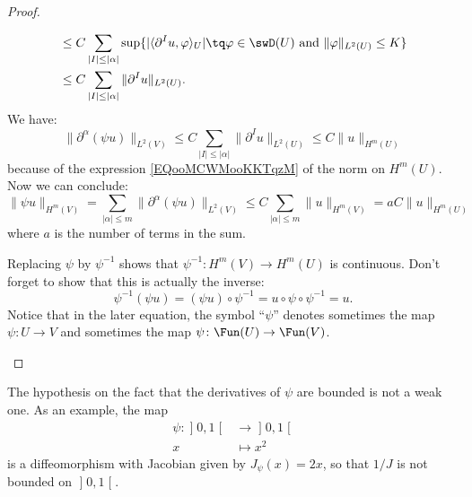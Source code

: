 \begin{proof}
\begin{subproof}
\begin{subequations}
\begin{align}
				                                         & \leq C\sum_{| I |\leq | \alpha |} \sup\{ |\langle \partial^Iu, \varphi\rangle_U|\tq \varphi\in\swD(U)\text{ and }\| \varphi \|_{L^2(U)}\leq K  \} \\
				                                         & \leq C\sum_{| I |\leq | \alpha |}\| \partial^Iu \|_{L^2(U)}.
			\end{align}
		\end{subequations}
		We have:
		\begin{equation}
			\| \partial^{\alpha}(\psi u) \|_{L^2(V)}\leq C\sum_{| I |\leq | \alpha |}\| \partial^Iu \|_{L^2(U)}\leq C\| u \|_{H^m(U)}
		\end{equation}
		because of the expression \eqref{EQooMCWMooKKTqzM} of the norm on \( H^m(U)\). Now we can conclude:
		\begin{equation}
			\| \psi u \|_{H^m(V)}=\sum_{| \alpha |\leq m}\| \partial^{\alpha}(\psi u) \|_{L^2(V)}\leq C\sum_{| \alpha |\leq m}\| u \|_{H^m(V)} = a C\| u  \|_{H^m(U)}
		\end{equation}
		where \( a\) is the number of terms in the sum.


		Replacing \( \psi\) by \( \psi^{-1}\) shows that \( \psi^{-1}\colon H^m(V)\to H^m(U)\) is continuous. Don't forget to show that this is actually the inverse:
		\begin{equation}
			\psi^{-1}(\psi u)=(\psi u)\circ \psi^{-1}=u\circ\psi\circ\psi^{-1}=u.
		\end{equation}
		Notice that in the later equation, the symbol ``$\psi$'' denotes sometimes the map \( \psi\colon U\to V\) and sometimes the map \( \psi\colon \Fun(U)\to \Fun(V)\).
	\end{subproof}
\end{proof}

\begin{remark}
	The hypothesis on the fact that the derivatives of \( \psi\) are bounded is not a weak one. As an example, the map
	\begin{equation}
		\begin{aligned}
			\psi\colon \mathopen] 0 , 1 \mathclose[ & \to \mathopen] 0 , 1 \mathclose[ \\
			x                                       & \mapsto x^2
		\end{aligned}
	\end{equation}
	is a diffeomorphism with Jacobian given by \( J_{\psi}(x)=2x\), so that \( 1/J\) is not bounded on \( \mathopen] 0 , 1 \mathclose[\).
\end{remark}

